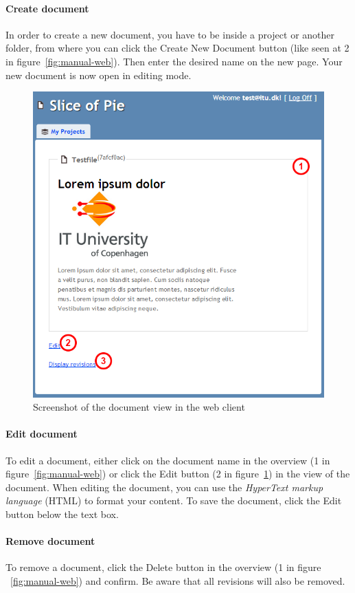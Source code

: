 	\paragraph{Create document}
	In order to create a new document, you have to be inside a project or another folder, from where you can click the Create New Document button (like seen at 2 in figure~\ref{fig:manual-web}). Then enter the desired name on the new page. Your new document is now open in editing mode.
	
	\begin{figure}[htb]
		\centering
		\includegraphics[width=1\textwidth]{User_manual/graphics/web-document.png}
		\caption{Screenshot of the document view in the web client}
		\label{fig:manual-web-document}
	\end{figure}
	
	\paragraph{Edit document}
	To edit a document, either click on the document name in the overview (1 in figure~\ref{fig:manual-web}) or click the Edit button (2 in figure~\ref{fig:manual-web-document}) in the view of the document. When editing the document, you can use the \emph{HyperText markup language}\cite{w3cHTML} (HTML) to format your content. To save the document, click the Edit button below the text box.
	
	\paragraph{Remove document}
	To remove a document, click the Delete button in the overview (1 in figure ~\ref{fig:manual-web}) and confirm. Be aware that all revisions will also be removed.